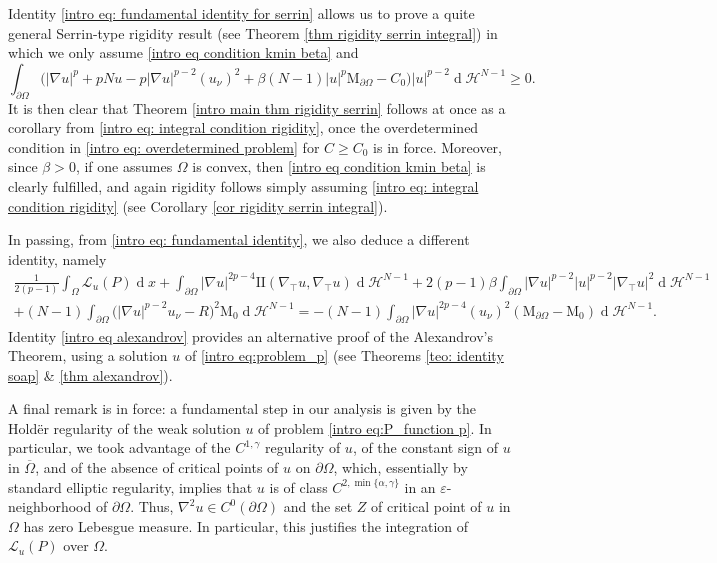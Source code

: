 \documentclass[10pt,a4paper, reqno]{amsart}
\numberwithin{equation}{section}
\renewcommand{\d}[1]{\ensuremath{\operatorname{d}\!{#1}}}
\begin{document}
Identity \ref{intro eq: fundamental identity for serrin} allows us to prove a quite general Serrin-type rigidity result (see Theorem \ref{thm rigidity serrin integral}) in which we only assume \eqref{intro eq condition kmin beta} and
\begin{equation}\label{intro eq: integral condition rigidity}
    \int_{\partial\Omega} \Big( |\nabla u|^p + pNu - p |\nabla u|^{p-2} (u_\nu)^2 + \beta(N-1) |u|^p \mathrm{M}_{\partial\Omega}  - C_0 \Big) |u|^{p-2} \d{}\mathcal{H}^{N-1} \geq 0.
\end{equation}
It is then clear that Theorem \ref{intro main thm rigidity serrin} follows at once as a corollary from \eqref{intro eq: integral condition rigidity}, once the overdetermined condition in \eqref{intro eq: overdetermined problem} for $C \geq C_0$ is in force. Moreover, since $\beta > 0$, if one assumes $\Omega$ is convex, then \eqref{intro eq condition kmin beta} is clearly fulfilled,  and again rigidity follows simply assuming \eqref{intro eq: integral condition rigidity} (see Corollary \ref{cor rigidity serrin integral}).


In passing, from \eqref{intro eq: fundamental identity}, we also deduce a different identity, namely
\begin{equation}\label{intro eq alexandrov}
    \begin{aligned}
    \frac{1}{2(p-1)}\int_\Omega \mathcal{L}_u(P) \d{x} 
    +\int_{\partial\Omega} |\nabla u|^{2p-4} \mathrm{I\!I}(\nabla_\top u,\nabla_\top u) \d{}\mathcal{H}^{N-1}
    + 2(p-1)\beta \int_{\partial\Omega} |\nabla u|^{p-2}|u|^{p-2}|\nabla_\top u|^2 \d{}\mathcal{H}^{N-1} 
    \\
    + (N-1) \int_{\partial\Omega} \Big(|\nabla u|^{p-2} u_\nu - R \Big)^2  \mathrm{M}_{0} \d{}\mathcal{H}^{N-1} 
    =
    - (N-1) \int_{\partial\Omega} |\nabla u|^{2p-4} (u_\nu)^2 (\mathrm{M}_{\partial\Omega} - \mathrm{M}_{0} ) \d{}\mathcal{H}^{N-1}.  
    \end{aligned}
\end{equation}
Identity \eqref{intro eq alexandrov} provides an alternative proof of the Alexandrov's Theorem, using a solution $u$ of \eqref{intro eq:problem_p} (see Theorems \ref{teo: identity soap} \& \ref{thm alexandrov}).

A final remark is in force: a fundamental step in our analysis is given by the Hold\"er regularity of the weak solution $u$ of problem \eqref{intro eq:P_function p}. In particular, we took advantage of the $C^{1,\gamma}$ regularity of $u$, of the constant sign of $u$ in $\overline{\Omega}$, and of the absence of critical points of $u$ on $\partial\Omega$, which, essentially by standard elliptic regularity, implies that $u$ is of class $C^{2,\min\{\alpha,\gamma\}}$ in an $\varepsilon$-neighborhood of $\partial\Omega$. Thus, $\nabla^2 u \in C^0(\partial\Omega)$ and the set $Z$ of critical point of $u$ in $\Omega$ has zero Lebesgue measure. In particular, this justifies the integration of $\mathcal{L}_u(P)$ over $\Omega$.
\end{document}
